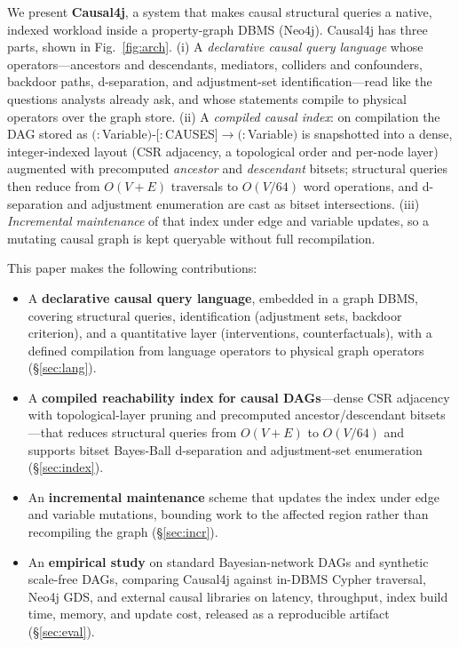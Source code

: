 
We present \textbf{Causal4j}, a system that makes causal structural queries a
native, indexed workload inside a property-graph DBMS (Neo4j). Causal4j has
three parts, shown in Fig.~\ref{fig:arch}. (i) A \emph{declarative causal query
language} whose operators---ancestors and descendants, mediators, colliders and
confounders, backdoor paths, d-separation, and adjustment-set
identification---read like the questions analysts already ask, and whose
statements compile to physical operators over the graph store. (ii) A
\emph{compiled causal index}: on compilation the DAG stored as
$(:$\textsf{Variable}$)\text{-}[:$\textsf{CAUSES}$]\!\rightarrow\!(:$\textsf{Variable}$)$
is snapshotted into a dense, integer-indexed layout (CSR adjacency, a
topological order and per-node layer) augmented with precomputed
\emph{ancestor} and \emph{descendant} bitsets; structural queries then reduce
from $O(V{+}E)$ traversals to $O(V/64)$ word operations, and d-separation and
adjustment enumeration are cast as bitset intersections. (iii) \emph{Incremental
maintenance} of that index under edge and variable updates, so a mutating causal
graph is kept queryable without full recompilation.


This paper makes the following contributions:
\begin{itemize}
  \item A \textbf{declarative causal query language}, embedded in a graph DBMS,
  covering structural queries, identification (adjustment sets, backdoor
  criterion), and a quantitative layer (interventions, counterfactuals), with a
  defined compilation from language operators to physical graph operators
  (\S\ref{sec:lang}).
  \item A \textbf{compiled reachability index for causal DAGs}---dense CSR
  adjacency with topological-layer pruning and precomputed ancestor/descendant
  bitsets---that reduces structural queries from $O(V{+}E)$ to $O(V/64)$ and
  supports bitset Bayes-Ball d-separation and adjustment-set enumeration
  (\S\ref{sec:index}).
  \item An \textbf{incremental maintenance} scheme that updates the index under
  edge and variable mutations, bounding work to the affected region rather than
  recompiling the graph (\S\ref{sec:incr}).
  \item An \textbf{empirical study} on standard Bayesian-network DAGs and
  synthetic scale-free DAGs, comparing Causal4j against in-DBMS Cypher traversal,
  Neo4j GDS, and external causal libraries on latency, throughput, index build
  time, memory, and update cost, released as a reproducible artifact
  (\S\ref{sec:eval}).
\end{itemize}

